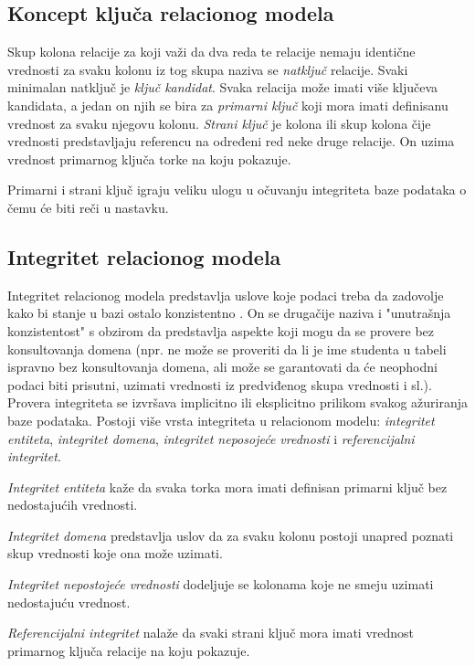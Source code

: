 \documentclass[12pt,oneside]{memoir}
\begin{document}
\subsection{Koncept ključa relacionog modela}

Skup kolona relacije za koji važi da dva reda te relacije nemaju identične vrednosti za svaku kolonu iz tog skupa naziva  se \textit{natključ} relacije. Svaki minimalan natključ je \textit{ključ kandidat}. Svaka relacija može imati više ključeva kandidata, a jedan on njih se bira za  \textit{primarni ključ} koji mora imati definisanu vrednost za svaku njegovu kolonu.
\textit{Strani ključ} je kolona ili skup kolona čije vrednosti predstavljaju referencu na određeni red neke druge relacije. On uzima vrednost primarnog ključa torke na koju pokazuje. 

Primarni i strani ključ igraju veliku ulogu u očuvanju integriteta baze podataka o čemu će biti reči u nastavku.

\subsection{Integritet relacionog modela}

Integritet relacionog modela predstavlja uslove koje podaci treba da zadovolje kako bi stanje u bazi ostalo konzistentno \cite{URBP}. On se drugačije naziva i "unutrašnja konzistentost" s obzirom da predstavlja aspekte koji mogu da se provere bez konsultovanja domena (npr. ne može se proveriti da li je ime studenta u tabeli ispravno bez konsultovanja domena, ali može se garantovati da će neophodni podaci biti prisutni, uzimati vrednosti iz predviđenog skupa vrednosti i sl.). Provera integriteta se izvršava implicitno ili eksplicitno prilikom svakog ažuriranja baze podataka. Postoji više vrsta integriteta u relacionom modelu:  \textit{integritet entiteta}, \textit{integritet domena}, \textit{integritet neposojeće vrednosti} i \textit{referencijalni integritet}.

 \textit{Integritet entiteta} kaže da svaka torka mora imati definisan primarni ključ bez nedostajućih vrednosti.

\textit{Integritet domena} predstavlja uslov da za svaku kolonu postoji unapred poznati skup vrednosti koje ona može uzimati.

\textit{Integritet nepostojeće vrednosti} dodeljuje se kolonama koje  ne smeju uzimati nedostajuću vrednost.

\textit{Referencijalni integritet} nalaže da svaki strani ključ mora imati vrednost primarnog ključa relacije na koju pokazuje.
\end{document}
